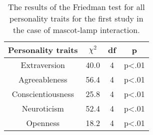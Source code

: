 \begin{table}[hbt!]
    \renewcommand{\arraystretch}{1}
    \begin{center}
        \begin{tabular}{|c|c|c|c|}
            \hline
            \textbf{Personality traits} & \textbf{$\chi^2$} & \textbf{df} & \textbf{p} \\
            \hline
            Extraversion &40.0 &4 & p<.01 \\
            \hline
            Agreeableness &56.4 &4 & p<.01 \\
            \hline
            Conscientiousness &25.8 &4 & p<.01\\
            \hline
            Neuroticism &52.4 &4 & p<.01 \\
            \hline
            Openness &18.2 &4 & p<.01 \\
            \hline
        \end{tabular}
        \caption{The results of the Friedman test for all personality traits for the first study
        in the case of mascot-lamp interaction.}
        \label{table:friedmanML1}
    \end{center}
\end{table}

